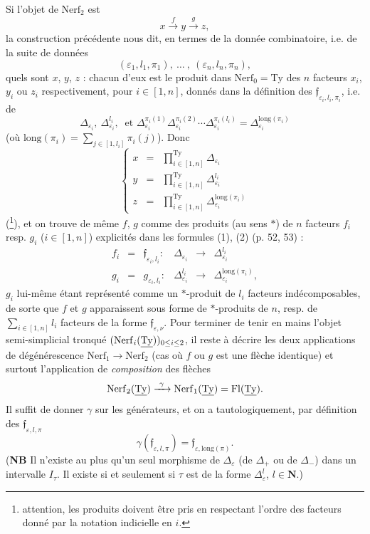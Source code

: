Si l'objet de $\mathrm{Nerf}_2$ est
\[
x\xrightarrow{\ f\ }y\xrightarrow{\ g\ }z,
\]
la construction précédente nous dit, en termes de la donnée combinatoire, i.e. de la suite de données
\[
(\varepsilon_1,l_1,\pi_1),\ \dots\ ,\ (\varepsilon_n,l_n,\pi_n),
\]
quels sont $x$, $y$, $z$ : chacun d'eux est le produit dans $\mathrm{Nerf}_0=\mathrm{Ty}$ des $n$ facteurs $x_i$, $y_i$ ou $z_i$ respectivement, pour $i\in[1,n]$, donnés dans la définition des $\mathfrak{f}_{\varepsilon_i,l_i,\pi_i}$, i.e. de
\[
\Delta_{\varepsilon_i},\ \Delta^{l_i}_{\varepsilon_i},\ \text{ et }\Delta^{\pi_i(1)}_{\varepsilon_i}\Delta^{\pi_i(2)}_{\varepsilon_i}\cdots\Delta^{\pi_i(l_i)}_{\varepsilon_i}=\Delta^{\mathrm{long}(\pi_i)}_{\varepsilon_i}
\]
(où $\mathrm{long}(\pi_i)=\sum_{j\in[1,l_i]}\pi_i(j)$). Donc
\[
\left\{
\begin{array}{lcl}
x & = & \prod^{\mathrm{Ty}}_{i\in[1,n]}\Delta_{\varepsilon_i}\\[4pt]
y & = & \prod^{\mathrm{Ty}}_{i\in[1,n]}\Delta^{l_i}_{\varepsilon_i}\\[4pt]
z & = & \prod^{\mathrm{Ty}}_{i\in[1,n]}\Delta^{\mathrm{long}(\pi_i)}_{\varepsilon_i}
\end{array}
\right.
\]
(\footnote[16]{attention, les produits doivent être pris en respectant l'ordre des facteurs donné par la notation indicielle en $i$.}), et on trouve de même $f$, $g$ comme des produits (au sens $*$) de $n$ facteurs $f_i$ resp. $g_i$ ($i\in[1,n]$) explicités dans les formules (1), (2) (p. 52, 53) :
\[
\begin{array}{lclccl}
f_i & = & \mathfrak{f}_{\varepsilon_i,l_i} : & \Delta_{\varepsilon_i} & \longrightarrow & \Delta^{l_i}_{\varepsilon_i}\\[4pt]
g_i & = & g_{\varepsilon_i,l_i} : & \Delta^{l_i}_{\varepsilon_i} & \longrightarrow & \Delta^{\mathrm{long}(\pi_i)}_{\varepsilon_i}, %
\end{array}
\]
$g_i$ lui-même étant représenté comme un $*$-produit de $l_i$ facteurs indécomposables, de sorte que $f$ et $g$ apparaissent sous forme
de $*$-produits de $n$, resp. de $\sum_{i\in[1,n]}l_i$ facteurs de la forme $\mathfrak{f}_{\varepsilon,\nu}$. Pour terminer de tenir en mains l'objet semi-simplicial tronqué $(\mathrm{Nerf}_i(\underline{\mathrm{Ty}}))_{0\leq i\leq 2}$, il reste à décrire les deux applications de dégénérescence $\mathrm{Nerf}_1\longrightarrow\mathrm{Nerf}_2$ (cas où $f$ ou $g$ est une flèche identique) et surtout l'application de \textit{composition} des flèches
\[
\mathrm{Nerf}_2(\uTy)\xrightarrow{\ \gamma\ }\mathrm{Nerf}_1(\uTy)=\mathrm{Fl}(\uTy).
\]
Il suffit de donner $\gamma$ sur les générateurs, et on a tautologiquement, par définition des $\mathfrak{f}_{\varepsilon,l,\pi}$
\[
\gamma(\mathfrak{f}_{\varepsilon,l,\pi})=\mathfrak{f}_{\varepsilon,\mathrm{long}(\pi)}.
\]
(\textbf{NB} Il n'existe au plus qu'un seul morphisme de $\Delta_\varepsilon$ (de $\Delta_+$ ou de $\Delta_-$) dans un intervalle $I_\tau$. Il existe si et seulement si $\tau$ est de la forme $\Delta^l_\varepsilon$, $l\in\mathbf{N}$.)

